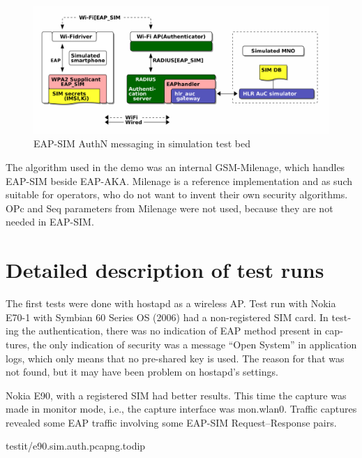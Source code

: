 \documentclass[12pt,a4paper,english]{tutthesis}
\begin{document}
\begin{otherlanguage}{english}
\begin{figure}[htb]
\centering
\includegraphics[width=.9\linewidth]{demoinfra.png}
\caption{\label{eap-sim-testbed}EAP-SIM AuthN messaging in simulation test bed}
\end{figure}





The algorithm used in the demo was an internal GSM-Milenage,
which handles EAP-SIM beside EAP-AKA.
Milenage is a reference implementation and as such suitable for operators, who do not 
want to invent their own security algorithms. OPc and Seq parameters from
Milenage were not used, because they are not needed in EAP-SIM. 

\section{Detailed description of test runs}
\label{sec-5-2}


The first tests were done with hostapd as a wireless AP.
Test run with Nokia E70-1 with Symbian 60 Series OS (2006) had a
non-registered SIM card. 
In testing the authentication,
there was no indication of EAP method present in captures, the only
indication of security was a message ``Open System'' in application
logs, which only means that no pre-shared key is used. The reason for
that was not found, but it may have been problem on hostapd's settings.




Nokia E90, with a registered SIM had better results. 
This time the capture was made in monitor mode, i.e., 
the capture interface was mon.wlan0.
Traffic captures revealed some EAP traffic involving some EAP-SIM
Request--Response pairs.


\renewcommand{\lstlistingname}{Capture}

  {testit/e90.sim.auth.pcapng.todip}


\end{otherlanguage}
\end{document}
